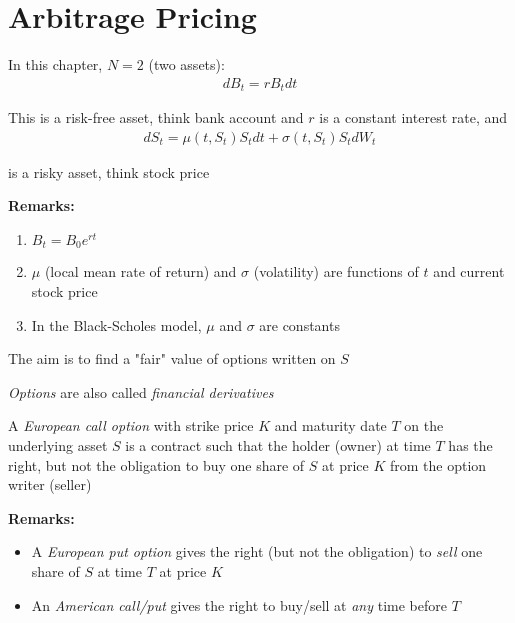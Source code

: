 \section{Arbitrage Pricing}
\noindent In this chapter, $N = 2$ (two assets):
\begin{equation*}
  \begin{gathered}
    dB_t = rB_tdt
  \end{gathered}
\end{equation*}\par
\noindent This is a risk-free asset, think bank account and $r$ is a constant interest rate, and 
\begin{equation*}
  \begin{gathered}
    dS_t = \mu(t,S_t)S_tdt + \sigma(t,S_t)S_tdW_t
  \end{gathered}
\end{equation*}\par
\noindent is a risky asset, think stock price
\par\bigskip
\noindent\textbf{Remarks:}\par
\begin{enumerate}[leftmargin=*]
  \item $B_t = B_0e^{rt}$
  \item $\mu$ (local mean rate of return) and $\sigma$ (volatility) are functions of $t$ and current stock price
  \item In the Black-Scholes model, $\mu$ and $\sigma$ are constants
\end{enumerate}\par
\noindent The aim is to find a "fair" value of options written on $S$\par
\noindent \textit{Options} are also called \textit{financial derivatives}
\par\bigskip
\begin{defo}{}
  A \textit{European call option} with strike price $K$ and maturity date $T$ on the underlying asset $S$ is a contract such that the holder (owner) at time $T$ has the right, but not the obligation to buy one share of $S$ at price $K$ from the option writer (seller)
\end{defo}
\par\bigskip
\noindent\textbf{Remarks:}\par
\begin{itemize}
  \item A \textit{European put option} gives the right (but not the obligation) to \textit{sell} one share of $S$ at time $T$ at price $K$
  \item An \textit{American call/put} gives the right to buy/sell at \textit{any} time before $T$
\end{itemize}
